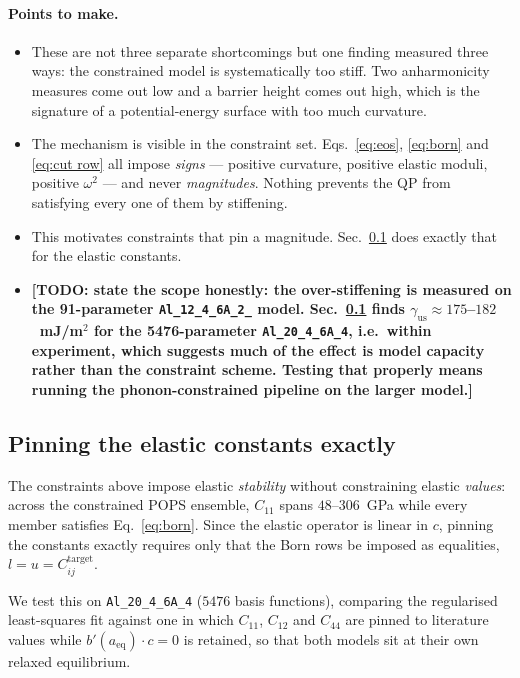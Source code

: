 \documentclass{article}
\newcommand{\TODO}[1]{{\color{blue}\textbf{[TODO: #1]}}}
\newcommand{\code}[1]{\texttt{\small #1}}
\begin{document}
\paragraph{Points to make.}
\begin{itemize}
  \item These are not three separate shortcomings but one finding measured three ways: the constrained model is systematically too stiff. Two anharmonicity measures come out low and a barrier height comes out high, which is the signature of a potential-energy surface with too much curvature.
  \item The mechanism is visible in the constraint set. Eqs.~\eqref{eq:eos}, \eqref{eq:born} and \eqref{eq:cut row} all impose \emph{signs} --- positive curvature, positive elastic moduli, positive $\omega^2$ --- and never \emph{magnitudes}. Nothing prevents the QP from satisfying every one of them by stiffening.
  \item This motivates constraints that pin a magnitude. Sec.~\ref{sec:exact cij} does exactly that for the elastic constants.
  \item \TODO{state the scope honestly: the over-stiffening is measured on the 91-parameter \code{Al\_12\_4\_6A\_2\_} model. Sec.~\ref{sec:exact cij} finds $\gamma_{\mathrm{us}}\approx175$--$182$~mJ/m$^2$ for the 5476-parameter \code{Al\_20\_4\_6A\_4}, i.e.\ within experiment, which suggests much of the effect is model capacity rather than the constraint scheme. Testing that properly means running the phonon-constrained pipeline on the larger model.}
\end{itemize}

\subsection{Pinning the elastic constants exactly}
\label{sec:exact cij}

The constraints above impose elastic \emph{stability} without constraining elastic
\emph{values}: across the constrained POPS ensemble, $C_{11}$ spans $48$--$306$~GPa
while every member satisfies Eq.~\eqref{eq:born}. Since the elastic operator is
linear in $c$, pinning the constants exactly requires only that the Born rows be
imposed as equalities, $l = u = C_{ij}^{\mathrm{target}}$.

We test this on \code{Al\_20\_4\_6A\_4} ($5476$ basis functions), comparing the
regularised least-squares fit against one in which $C_{11}$, $C_{12}$ and $C_{44}$
are pinned to literature values while $b'(a_{\mathrm{eq}})\cdot c = 0$ is retained,
so that both models sit at their own relaxed equilibrium.
\end{document}
